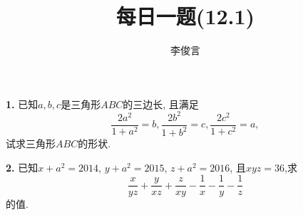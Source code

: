 \documentclass{article}
\title{每日一题(12.1)}
\author{\kaishu 李俊言}
\begin{document}
\maketitle
\textbf{1. }已知$a,b,c$是三角形$ABC$的三边长, 且满足
\[\frac{2a^2}{1+a^2}=b, \frac{2b^2}{1+b^2}=c, \frac{2c^2}{1+c^2}=a,\]  
试求三角形$ABC$的形状.\\\par
\textbf{2. }已知$x+a^2=2014$, $y+a^2=2015$, $z+a^2=2016$, 且$xyz=36$,求
\[\frac{x}{yz}+\frac{y}{xz}+\frac{z}{xy}-\frac{1}{x}-\frac{1}{y}-\frac{1}{z}\]
的值.
\end{document}
